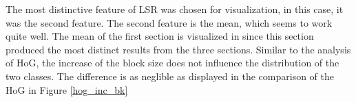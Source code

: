 The most distinctive feature of LSR was chosen for visualization, in this case,
it was the second feature. The second feature is the mean, which seems to work
quite well. The mean of the first section is visualized in since this section
produced the most distinct results from the three sections. Similar to the
analysis of HoG, the increase of the block size does not influence the
distribution of the two classes. The difference is as neglible as displayed in
the comparison of the HoG in Figure \ref{hog_inc_bk}


